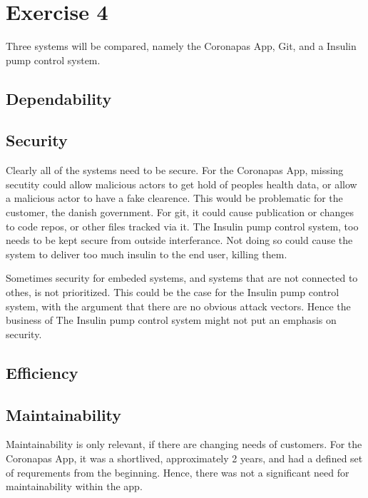 \section{Exercise 4}
Three systems will be compared, namely the Coronapas App, Git, and a Insulin pump control system.

\subsection{Dependability}



\subsection{Security}
Clearly all of the systems need to be secure.
For the Coronapas App, missing secutity could allow malicious actors to get hold of peoples health data, or allow a malicious actor to have a fake clearence.
This would be problematic for the customer, the danish government.
For git, it could cause publication or changes to code repos, or other files tracked via it.
The Insulin pump control system, too needs to be kept secure from outside interferance.
Not doing so could cause the system to deliver too much insulin to the end user, killing them.

Sometimes security for embeded systems, and systems that are not connected to othes, is not prioritized.
This could be the case for the Insulin pump control system, with the argument that there are no obvious attack vectors.
Hence the business of The Insulin pump control system might not put an emphasis on security.


\subsection{Efficiency}





\subsection{Maintainability}
Maintainability is only relevant, if there are changing needs of customers.
For the Coronapas App, it was a shortlived, approximately 2 years, and had a defined set of requrements from the beginning.
Hence, there was not a significant need for maintainability within the app.

